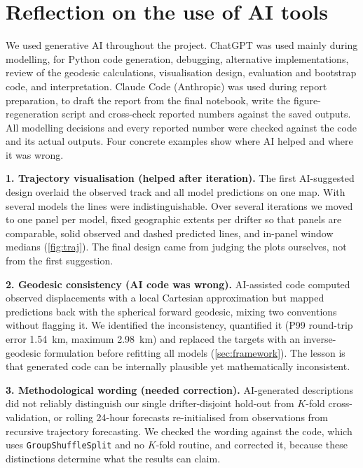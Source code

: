 \section{Reflection on the use of AI tools}\label{sec:ai}
We used generative AI throughout the project. ChatGPT was used mainly during modelling, for Python code generation, debugging, alternative implementations, review of the geodesic calculations, visualisation design, evaluation and bootstrap code, and interpretation. Claude Code (Anthropic) was used during report preparation, to draft the report from the final notebook, write the figure-regeneration script and cross-check reported numbers against the saved outputs. All modelling decisions and every reported number were checked against the code and its actual outputs. Four concrete examples show where AI helped and where it was wrong.

\textbf{1. Trajectory visualisation (helped after iteration).} The first AI-suggested design overlaid the observed track and all model predictions on one map. With several models the lines were indistinguishable. Over several iterations we moved to one panel per model, fixed geographic extents per drifter so that panels are comparable, solid observed and dashed predicted lines, and in-panel window medians (\cref{fig:traj}). The final design came from judging the plots ourselves, not from the first suggestion.

\textbf{2. Geodesic consistency (AI code was wrong).} AI-assisted code computed observed displacements with a local Cartesian approximation but mapped predictions back with the spherical forward geodesic, mixing two conventions without flagging it. We identified the inconsistency, quantified it (P99 round-trip error \SI{1.54}{km}, maximum \SI{2.98}{km}) and replaced the targets with an inverse-geodesic formulation before refitting all models (\cref{sec:framework}). The lesson is that generated code can be internally plausible yet mathematically inconsistent.

\textbf{3. Methodological wording (needed correction).} AI-generated descriptions did not reliably distinguish our single drifter-disjoint hold-out from $K$-fold cross-validation, or rolling 24-hour forecasts re-initialised from observations from recursive trajectory forecasting. We checked the wording against the code, which uses \texttt{GroupShuffleSplit} and no $K$-fold routine, and corrected it, because these distinctions determine what the results can claim.

